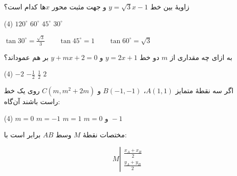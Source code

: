 \begin{enumerate}[label=\arabic*]
\begin{minipage}[c]{0.33\textwidth}
\end{minipage}
\end{enumerate}

\begin{example}
زاویۀ بین خط
$y=\sqrt{3}x-1$
و جهت مثبت محور $x$ها کدام است؟

\begin{tasks}(4)
    \task $120^\circ$
    \task $60^\circ$
    \task $45^\circ$
    \task $30^\circ$
\end{tasks}
\end{example}

\begin{remark}[یادآوری]
\hfill
$\tan 30^\circ = \frac{\sqrt{3}}{3} \qquad \tan 45^\circ = 1 \qquad \tan 60^\circ = \sqrt{3}$
\end{remark}


\begin{example}
به ازای چه مقداری از $m$ دو خط $y=2x+1$ و $y+mx+2=0$ بر هم عموداند؟

\begin{tasks}(4)
    \task $-2$
    \task $-\frac12$
    \task $\frac12$
    \task $2$
\end{tasks}
\end{example}

\begin{example}
اگر سه نقطۀ متمایز $A(1,1)$، $B(-1,-1)$ و $C(m,m^2+2m)$ روی یک خط راست باشند آن‌گاه:

\begin{tasks}(4)
    \task $m=0$
    \task $m=-1$
    \task $m=1$
    \task $m=0\text{ و }-1$
\end{tasks}
\end{example}

\vspace{0.4\baselineskip}

\begin{remark}
مختصات نقطۀ $M$ وسط $AB$ برابر است با:
\hfill\begin{minipage}[c]{0.2\textwidth}
$$M\left|\begin{matrix}
\frac{x_{\! \scriptscriptstyle A}+x_{\! \scriptscriptstyle B}}{2}
\\
\frac{y_{\! \scriptscriptstyle A}+y_{\! \scriptscriptstyle B}}{2}
\end{matrix}\right.$$
\end{minipage}
\end{remark}

